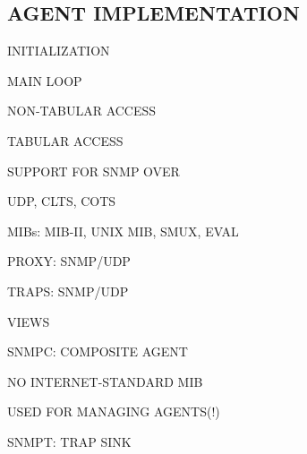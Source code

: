 \begin{bwslide}
\part	{AGENT IMPLEMENTATION}\bf

\begin{nrtc}
\item	INITIALIZATION

\item	MAIN LOOP

\item	NON-TABULAR ACCESS

\item	TABULAR ACCESS
\end{nrtc}
\end{bwslide}


\begin{bwslide}

\begin{nrtc}
\item	SUPPORT FOR SNMP OVER
    \begin{nrtc}
    \item	UDP, CLTS, COTS
    \end{nrtc}

\item	MIBs: MIB-II, UNIX MIB, SMUX, EVAL

\item	PROXY: SNMP/UDP

\item	TRAPS: SNMP/UDP

\item	VIEWS
\end{nrtc}
\end{bwslide}


\begin{bwslide}

\begin{nrtc}
\item	SNMPC: COMPOSITE AGENT
    \begin{nrtc}
    \item	NO INTERNET-STANDARD MIB

    \item	USED FOR MANAGING AGENTS(!)
    \end{nrtc}

\item	SNMPT: TRAP SINK
\end{nrtc}
\end{bwslide}


